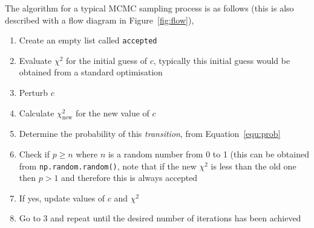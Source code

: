 \documentclass[a4paper]{article}
\begin{document}
The algorithm for a typical MCMC sampling process is as follows (this is also described with a flow diagram in Figure~\ref{fig:flow}), 
\begin{enumerate}
  \item {Create an empty list called \texttt{accepted}}
  \item {Evaluate $\chi^2$ for the initial guess of $c$, typically this initial guess would be obtained from a standard optimisation}
  \item {Perturb $c$}
  \item {Calculate $\chi^2_{\text{new}}$ for the new value of $c$}
  \item {Determine the probability of this \emph{transition}, from Equation~\ref{equ:prob}}
  \item {Check if $p \ge n$ where $n$ is a random number from 0 to 1 (this can be obtained from \texttt{np.random.random()}, note that if the new $\chi^2$ is less than the old one then $p > 1$ and therefore this is always accepted}
  \item {If yes, update values of $c$ and $\chi^2$}
  \item {Go to 3 and repeat until the desired number of iterations has been achieved}
\end{enumerate}
\end{document}
